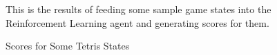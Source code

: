 \documentclass[letterpaper]{article} %
\begin{document}
\begin{figure}[h!]
{    }\hfill
    \caption{Scores for Some Tetris States}
    \medskip
    \footnotesize
    This is the results of feeding some sample game states into the Reinforcement Learning agent and generating scores for them. 
  \end{figure}


  \newpage
\end{document}
